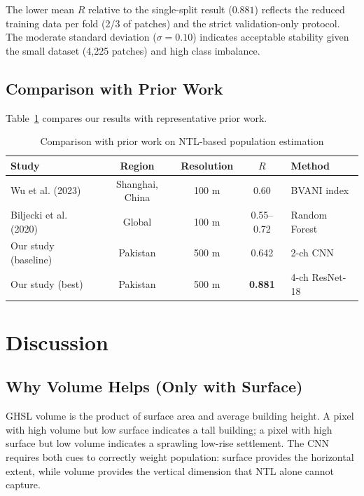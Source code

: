 \documentclass[12pt,a4paper]{article}
\begin{document}
The lower mean $R$ relative to the single-split result ($0.881$) reflects the reduced training data per fold (2/3 of patches) and the strict validation-only protocol. The moderate standard deviation ($\sigma = 0.10$) indicates acceptable stability given the small dataset (4,225 patches) and high class imbalance.

\subsection{Comparison with Prior Work}
\label{subsec:prior_results}

Table~\ref{tab:prior} compares our results with representative prior work.

\begin{table}[H]
\centering
\caption{Comparison with prior work on NTL-based population estimation}
\label{tab:prior}
\begin{tabular}{@{}p{4.5cm}cccp{3cm}@{}}
\toprule
\textbf{Study} & \textbf{Region} & \textbf{Resolution} & \textbf{$R$} & \textbf{Method} \\
\midrule
Wu et al. (2023) \citep{wu2023bvani} & Shanghai, China & 100 m & 0.60 & BVANI index \\
Biljecki et al. (2020) & Global & 100 m & 0.55--0.72 & Random Forest \\
Our study (baseline) & Pakistan & 500 m & 0.642 & 2-ch CNN \\
Our study (best) & Pakistan & 500 m & \textbf{0.881} & 4-ch ResNet-18 \\
\bottomrule
\end{tabular}
\end{table}

\section{Discussion}
\label{sec:discussion}

\subsection{Why Volume Helps (Only with Surface)}
\label{subsec:why_volume}

GHSL volume is the product of surface area and average building height. A pixel with high volume but low surface indicates a tall building; a pixel with high surface but low volume indicates a sprawling low-rise settlement. The CNN requires both cues to correctly weight population: surface provides the horizontal extent, while volume provides the vertical dimension that NTL alone cannot capture.
\end{document}

